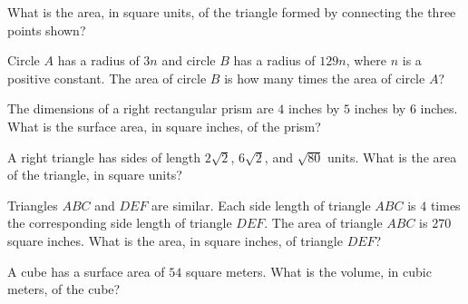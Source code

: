 What is the area, in square units, of the triangle formed by connecting the three points shown?

\vspace{2em}

\newpage
\noindent\markforreview
\vspace{1em}

Circle $A$ has a radius of $3n$ and circle $B$ has a radius of $129n$, where $n$ is a positive constant.  
The area of circle $B$ is how many times the area of circle $A$?

\vspace{0.75em}


\vspace{2em}

\noindent\markforreview
\vspace{1em}

The dimensions of a right rectangular prism are $4$ inches by $5$ inches by $6$ inches.  
What is the surface area, in square inches, of the prism?

\vspace{0.75em}


\vspace{2em}

\newpage
\noindent\markforreview
\vspace{1em}

A right triangle has sides of length $2\sqrt{2}$, $6\sqrt{2}$, and $\sqrt{80}$ units.  
What is the area of the triangle, in square units?

\vspace{0.75em}




\vspace{2em}


\vspace{0.01mm}

\noindent\markforreview
\vspace{1em}

Triangles $ABC$ and $DEF$ are similar.  
Each side length of triangle $ABC$ is $4$ times the corresponding side length of triangle $DEF$.  
The area of triangle $ABC$ is $270$ square inches.  
What is the area, in square inches, of triangle $DEF$?

\vspace{2em}

\noindent\markforreview
\vspace{1em}

A cube has a surface area of $54$ square meters.  
What is the volume, in cubic meters, of the cube?

\vspace{0.75em}


\newpage
